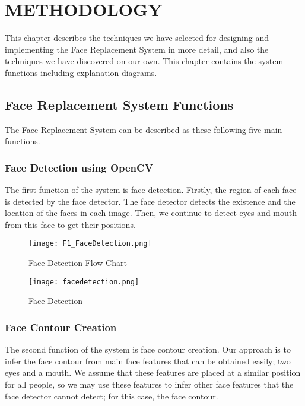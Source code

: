 \chapter{METHODOLOGY}\label{chap:METHODOLOGY}
\hspace{0.5in}This chapter describes the techniques we have selected for designing and implementing the Face Replacement System in more detail, and also the techniques we have discovered on our own. This chapter contains the system functions including explanation diagrams.

\section{Face Replacement System Functions}
The Face Replacement System can be described as these following five main functions.

\subsection{Face Detection using OpenCV}

\hspace{0.5in}The first function of the system is face detection. Firstly, the region of each face is detected by the face detector. The face detector detects the existence and the location of the faces in each image. Then, we continue to detect eyes and mouth from this face to get their positions.

\begin{figure}[htb]
   \centering
   \texttt{[image: F1\_FaceDetection.png]}
   \caption{Face Detection Flow Chart}
   \label{fig:FaceDetectionDiagram}
\end{figure}

\begin{figure}[htb]
   \centering
   \texttt{[image: facedetection.png]}
   \caption{Face Detection}
   \label{fig:FaceDetection}
\end{figure}

\subsection{Face Contour Creation}

\hspace{0.5in}The second function of the system is face contour creation. Our approach is to infer the face contour from main face features that can be obtained easily; two eyes and a mouth. We assume that these features are placed at a similar position for all people, so we may use these features to infer other face features that the face detector cannot detect; for this case, the face contour.

